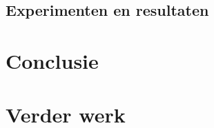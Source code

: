 \documentclass{article}
\begin{document}
\subsection{Experimenten en resultaten}


\section{Conclusie}


\section{Verder werk}






% 
% 
\end{document}
